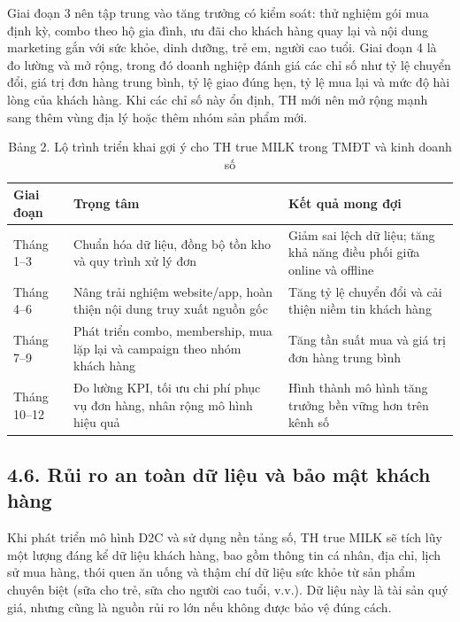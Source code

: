 Giai đoạn 3 nên tập trung vào tăng trưởng có kiểm soát: thử nghiệm gói mua định kỳ, combo theo hộ gia đình, ưu đãi cho khách hàng quay lại và nội dung marketing gắn với sức khỏe, dinh dưỡng, trẻ em, người cao tuổi. Giai đoạn 4 là đo lường và mở rộng, trong đó doanh nghiệp đánh giá các chỉ số như tỷ lệ chuyển đổi, giá trị đơn hàng trung bình, tỷ lệ giao đúng hẹn, tỷ lệ mua lại và mức độ hài lòng của khách hàng. Khi các chỉ số này ổn định, TH mới nên mở rộng mạnh sang thêm vùng địa lý hoặc thêm nhóm sản phẩm mới.

\begin{table}[htbp]
\centering
\renewcommand{\arraystretch}{1.25}
\begin{tabular}{>{\raggedright\arraybackslash}p{} >{\raggedright\arraybackslash}p{} >{\raggedright\arraybackslash}p{}}
\toprule
\textbf{Giai đoạn} & \textbf{Trọng tâm} & \textbf{Kết quả mong đợi} \\
\midrule
Tháng 1--3 & Chuẩn hóa dữ liệu, đồng bộ tồn kho và quy trình xử lý đơn & Giảm sai lệch dữ liệu; tăng khả năng điều phối giữa online và offline \\
Tháng 4--6 & Nâng trải nghiệm website/app, hoàn thiện nội dung truy xuất nguồn gốc & Tăng tỷ lệ chuyển đổi và cải thiện niềm tin khách hàng \\
Tháng 7--9 & Phát triển combo, membership, mua lặp lại và campaign theo nhóm khách hàng & Tăng tần suất mua và giá trị đơn hàng trung bình \\
Tháng 10--12 & Đo lường KPI, tối ưu chi phí phục vụ đơn hàng, nhân rộng mô hình hiệu quả & Hình thành mô hình tăng trưởng bền vững hơn trên kênh số \\
\bottomrule
\end{tabular}
\caption{Bảng 2. Lộ trình triển khai gợi ý cho TH true MILK trong TMĐT và kinh doanh số}
\end{table}

\subsection*{4.6. Rủi ro an toàn dữ liệu và bảo mật khách hàng}
Khi phát triển mô hình D2C và sử dụng nền tảng số, TH true MILK sẽ tích lũy một lượng đáng kể dữ liệu khách hàng, bao gồm thông tin cá nhân, địa chỉ, lịch sử mua hàng, thói quen ăn uống và thậm chí dữ liệu sức khỏe từ sản phẩm chuyên biệt (sữa cho trẻ, sữa cho người cao tuổi, v.v.). Dữ liệu này là tài sản quý giá, nhưng cũng là nguồn rủi ro lớn nếu không được bảo vệ đúng cách.

